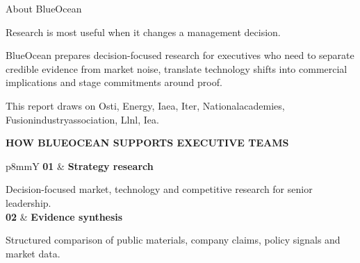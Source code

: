 \documentclass[10pt,a4paper]{article}
\begin{document}
\clearpage
\noindent{}\par\vspace{8pt}
{\sffamily\fontsize{24}{30}\selectfont\color{BONavy} About BlueOcean}\par\vspace{10pt}
\begin{minipage}[t]{0.44\linewidth}
{\sffamily\fontsize{16}{22}\selectfont\color{BOGreen} Research is most useful when it changes a management decision.}\par\vspace{8pt}
{\footnotesize\color{BOText} BlueOcean prepares decision-focused research for executives who need to separate credible evidence from market noise, translate technology shifts into commercial implications and stage commitments around proof.}\par\vspace{7pt}
{\footnotesize\color{BOMuted} This report draws on Osti, Energy, Iaea, Iter, Nationalacademies, Fusionindustryassociation, Llnl, Iea.}\par
\vspace{10pt}
\end{minipage}\hfill\begin{minipage}[t]{0.48\linewidth}
{\textcolor{BOGreen}{\scriptsize\bfseries HOW BLUEOCEAN SUPPORTS EXECUTIVE TEAMS}}\par\vspace{5pt}
\begin{tabularx}{\linewidth}{p{8mm}Y}
\textcolor{BOGreen}{\bfseries 01} & {\scriptsize\bfseries Strategy research}\par{\scriptsize Decision-focused market, technology and competitive research for senior leadership.} \\[6pt]
\textcolor{BOGreen}{\bfseries 02} & {\scriptsize\bfseries Evidence synthesis}\par{\scriptsize Structured comparison of public materials, company claims, policy signals and market data.} \\[6pt]

\end{tabularx}
\end{minipage}
\end{document}
